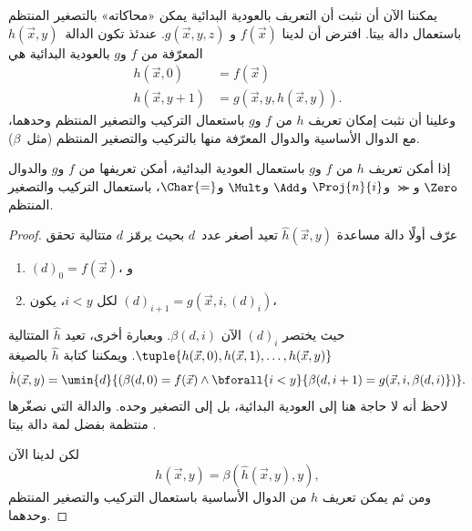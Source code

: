 \documentclass[../../../include/open-logic-section]{subfiles}
\begin{document}

يمكننا الآن أن نثبت أن التعريف بالعودية البدائية يمكن «محاكاته»
بالتصغير المنتظم باستعمال دالة بيتا. افترض أن لدينا $f(\vec x)$ و
$g(\vec x,y,z)$. عندئذ تكون الدالة~$h(\vec x,y)$ المعرّفة من $f$
و$g$ بالعودية البدائية هي
\begin{align*}
h(\vec x, 0) & =  f(\vec x) \\
h(\vec x, y+1) & =  g(\vec x, y, h(\vec x, y)).
\end{align*}
وعلينا أن نثبت إمكان تعريف $h$ من $f$ و$g$ باستعمال التركيب والتصغير
المنتظم وحدهما، مع الدوال الأساسية والدوال المعرّفة منها بالتركيب
والتصغير المنتظم (مثل~$\beta$).

\begin{lem}
إذا أمكن تعريف $h$ من $f$ و$g$ باستعمال العودية البدائية، أمكن
تعريفها من $f$ و$g$ والدوال $\Zero$ و$\Succ$ و$\Proj{n}{i}$ و$\Add$
و$\Mult$ و$\Char{=}$، باستعمال التركيب والتصغير المنتظم.
\end{lem}

\begin{proof}
عرّف أولًا دالة مساعدة $\hat h(\vec x,y)$ تعيد أصغر عدد~$d$ بحيث يرمّز
$d$ متتالية تحقق
\begin{enumerate}
\item $(d)_0=f(\vec x)$، و
\item لكل $i<y$، يكون $(d)_{i+1}=g(\vec x,i,(d)_i)$،
\end{enumerate}
حيث يختصر $(d)_i$ الآن $\beta(d,i)$. وبعبارة أخرى، تعيد $\hat h$
المتتالية
$\tuple{h(\vec x,0),h(\vec x,1),\dots,h(\vec x,y)}$. ويمكننا كتابة
$\hat h$ بالصيغة
\[
\hat h(\vec x, y) = \umin{d}{(\beta(d,0) = f(\vec x) \land \bforall{i <
  y}{\beta(d,i+1) = g(\vec x, i,\beta(d,i)})}.
\]
لاحظ أنه لا حاجة هنا إلى العودية البدائية، بل إلى التصغير وحده.
والدالة التي نصغّرها منتظمة بفضل لمة دالة بيتا
.

لكن لدينا الآن
\[
h(\vec x, y) = \beta(\hat h(\vec x, y), y),
\]
ومن ثم يمكن تعريف $h$ من الدوال الأساسية باستعمال التركيب والتصغير
المنتظم وحدهما.
\end{proof}
\end{document}
